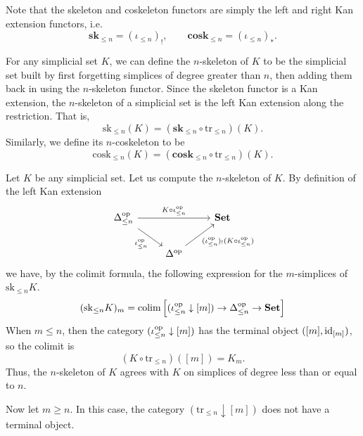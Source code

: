 \documentclass[main.tex]{subfiles}
\begin{document}
Note that the skeleton and coskeleton functors are simply the left and right Kan extension functors, i.e.\
\begin{equation*}
  \mathbf{sk}_{\leq n} = (\iota_{\leq n})_{!},\qquad \mathbf{cosk}_{\leq n} = (\iota_{\leq n})_{*}.
\end{equation*}

For any simplicial set $K$, we can define the $n$-skeleton of $K$ to be the simplicial set built by first forgetting simplices of degree greater than $n$, then adding them back in using the $n$-skeleton functor. Since the skeleton functor is a Kan extension, the $n$-skeleton of a simplicial set is the left Kan extension along the restriction. That is,
\begin{equation*}
  \mathrm{sk}_{\leq n}(K) = (\mathbf{sk}_{\leq n} \circ \mathrm{tr}_{\leq n})(K).
\end{equation*}
Similarly, we define its $n$-coskeleton to be
\begin{equation*}
  \mathrm{cosk}_{\leq n}(K) = (\mathbf{cosk}_{\leq n} \circ \mathrm{tr}_{\leq n})(K).
\end{equation*}

\begin{example}
  Let $K$ be any simplicial set. Let us compute the $n$-skeleton of $K$. By definition of the left Kan extension
  \begin{equation*}
    \begin{tikzcd}
      \Delta\op_{\leq n}
      \arrow[rr, "K \circ \iota_{\leq n}\op"]
      \arrow[dr, swap, "\iota_{\leq n}\op"]
      && \mathbf{Set}
      \\
      & \Delta\op
      \arrow[ur, swap, "(\iota_{\leq n}\op)_{!}(K \circ \iota_{\leq n}\op)"]
    \end{tikzcd}
  \end{equation*}
  we have, by the colimit formula, the following expression for the $m$-simplices of $\mathrm{sk}_{\leq n}K$.
  \begin{equation*}
    (\mathrm{sk}_{\leq n}K)_{m} = \operatorname*{colim}\left[ (\iota_{\leq n}^{\mathrm{op}} \downarrow [m]) \to \Delta^{\mathrm{op}}_{\leq n} \to \mathbf{Set} \right]
  \end{equation*}
  When $m \leq n$, then the category $(\iota_{\leq n}^{\mathrm{op}} \downarrow [m])$ has the terminal object $([m], \mathrm{id}_{[m]})$, so the colimit is
  \begin{equation*}
    (K \circ \mathrm{tr}_{\leq n})([m]) = K_{m}.
  \end{equation*}
  Thus, the $n$-skeleton of $K$ agrees with $K$ on simplices of degree less than or equal to $n$.

  Now let $m \geq n$. In this case, the category $(\mathrm{tr}_{\leq n} \downarrow [m])$ does not have a terminal object.
\end{example}
\end{document}
